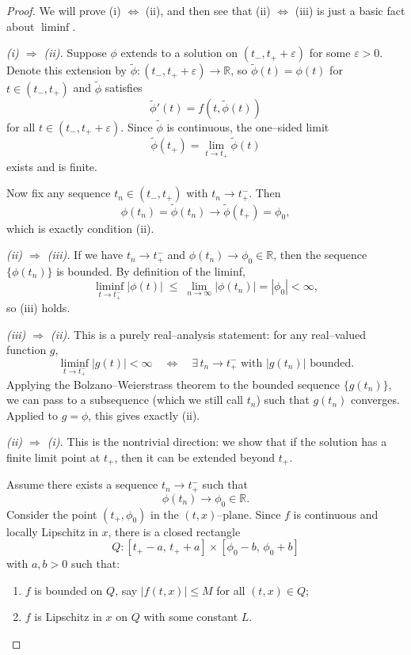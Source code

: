 \documentclass{tufte-handout}
\newcommand*\R{\mathbb{R}}
\theoremstyle{definition}
\begin{document}
\begin{proof}
	We will prove (i) $\Leftrightarrow$ (ii), and then see that (ii) $\Leftrightarrow$ (iii)
	is just a basic fact about $\liminf$.

	\medskip

	\noindent\emph{(i) $\Rightarrow$ (ii).}
	Suppose $\phi$ extends to a solution on $(t_-,t_+ + \varepsilon)$ for some $\varepsilon > 0$.
	Denote this extension by $\tilde\phi \colon (t_-,t_+ + \varepsilon) \to \R$, so
	$\tilde\phi(t) = \phi(t)$ for $t \in (t_-,t_+)$ and $\tilde\phi$ satisfies
	\[
		\tilde\phi'(t) = f(t,\tilde\phi(t))
	\]
	for all $t \in (t_-,t_+ + \varepsilon)$.
	Since $\tilde\phi$ is continuous, the one–sided limit
	\[
		\tilde\phi(t_+) = \lim_{t \to t_+} \tilde\phi(t)
	\]
	exists and is finite.

	Now fix any sequence $t_n \in (t_-,t_+)$ with $t_n \to t_+^{-}$. Then
	\[
		\phi(t_n) = \tilde\phi(t_n) \to \tilde\phi(t_+) = \phi_0,
	\]
	which is exactly condition (ii).

	\medskip

	\noindent\emph{(ii) $\Rightarrow$ (iii).}
	If we have $t_n \to t_+^{-}$ and $\phi(t_n) \to \phi_0 \in \R$, then the sequence
	$\{ \phi(t_n) \}$ is bounded.
	By definition of the liminf,
	\[
		\liminf_{t \to t_+^{-}} |\phi(t)|
		\;\le\; \lim_{n \to \infty} |\phi(t_n)|
		= |\phi_0| < \infty,
	\]
	so (iii) holds.

	\medskip

	\noindent\emph{(iii) $\Rightarrow$ (ii).}
	This is a purely real–analysis statement: for any real–valued function $g$,
	\[
		\liminf_{t \to t_+^{-}} |g(t)| < \infty
		\quad \Longleftrightarrow \quad
		\exists \, t_n \to t_+^{-} \text{ with } |g(t_n)| \text{ bounded.}
	\]
	Applying the Bolzano–Weierstrass theorem to the bounded sequence $\{g(t_n)\}$,
	we can pass to a subsequence (which we still call $t_n$) such that $g(t_n)$ converges.
	Applied to $g = \phi$, this gives exactly (ii).

	\medskip

	\noindent\emph{(ii) $\Rightarrow$ (i).}
	This is the nontrivial direction: we show that if the solution has a finite
	limit point at $t_+$, then it can be extended beyond $t_+$.

	Assume there exists a sequence $t_n \to t_+^{-}$ such that
	\[
		\phi(t_n) \to \phi_0 \in \R.
	\]
	Consider the point $(t_+,\phi_0)$ in the $(t,x)$–plane. Since $f$ is continuous and
	locally Lipschitz in $x$, there is a closed rectangle
	\[
		Q: [t_+ - a,\, t_+ + a] \times [\phi_0 - b,\, \phi_0 + b]
	\]
	with $a,b>0$ such that:
	\begin{enumerate}[(1)]
		\item $f$ is bounded on $Q$, say $|f(t,x)| \le M$ for all $(t,x) \in Q$;
		\item $f$ is Lipschitz in $x$ on $Q$ with some constant $L$.
	\end{enumerate}


\end{proof}
\end{document}
